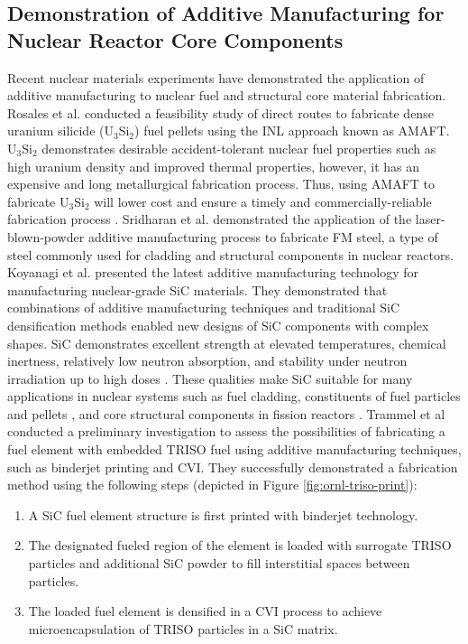 \subsection{Demonstration of Additive Manufacturing for Nuclear Reactor Core Components}
Recent nuclear materials experiments have demonstrated the application 
of additive manufacturing to nuclear fuel and structural core material fabrication. 
Rosales et al. \cite{rosales_characterizing_2019} conducted a feasibility study 
of direct routes to fabricate dense uranium silicide (U$_3$Si$_2$) fuel pellets 
using the \gls{INL} approach known as \gls{AMAFT}. 
U$_3$Si$_2$ demonstrates desirable accident-tolerant nuclear fuel properties 
such as high uranium density and improved thermal properties, however, it has 
an expensive and long metallurgical fabrication process. 
Thus, using \gls{AMAFT} to fabricate U$_3$Si$_2$ will lower cost and ensure a
timely and commercially-reliable fabrication process \cite{rosales_characterizing_2019}.  
Sridharan et al. \cite{sridharan_performance_2019} demonstrated the application of
the laser-blown-powder additive manufacturing process to fabricate \gls{FM} steel, a type of 
steel commonly used for cladding and structural components in nuclear reactors. 
Koyanagi et al. \cite{koyanagi_additive_2020} presented the latest 
additive manufacturing technology for manufacturing nuclear-grade \gls{SiC} materials. 
They demonstrated that combinations of additive manufacturing techniques and 
traditional \gls{SiC} densification methods enabled new designs of \gls{SiC} 
components with complex shapes. 
\gls{SiC} demonstrates excellent strength at elevated temperatures, chemical inertness, 
relatively low neutron absorption, and stability under neutron irradiation up 
to high doses \cite{sauder_ceramic_2014, snead_handbook_2007,koyanagi_additive_2020}. 
These qualities make \gls{SiC} suitable for many applications in nuclear systems 
such as fuel cladding, constituents of fuel particles \cite{snead_handbook_2007} 
and pellets \cite{terrani_progress_2015}, and core structural components in fission 
reactors \cite{sauder_ceramic_2014}. 
Trammel et al \cite{trammell_advanced_2019} conducted a preliminary investigation 
to assess the possibilities of fabricating a fuel element with embedded 
\gls{TRISO} fuel using additive manufacturing techniques, such as binderjet printing and \gls{CVI}. 
They successfully demonstrated a fabrication method using the following steps 
(depicted in Figure \ref{fig:ornl-triso-print}): 
\begin{enumerate}
    \item A SiC fuel element structure is first printed with binderjet technology. 
    \item The designated fueled region of the element is loaded with surrogate 
    \gls{TRISO} particles and additional SiC powder to fill interstitial spaces
    between particles. 
    \item The loaded fuel element is densified in a \gls{CVI} process to achieve 
    microencapsulation of \gls{TRISO} particles in a SiC matrix. 
\end{enumerate}
